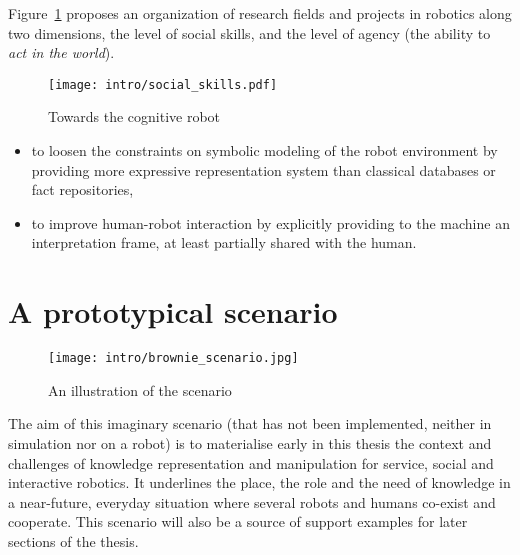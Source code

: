 Figure~\ref{fig|cognitive-robots} proposes an organization of research fields
and projects in robotics along two dimensions, the level of social skills, and
the level of agency (the ability to \emph{act in the world}).

\begin{figure}
    \centering
    \texttt{[image: intro/social\_skills.pdf]}
    \caption{Towards the cognitive robot}
    \label{fig|cognitive-robots}
\end{figure}



\begin{itemize}
    \item to loosen the constraints on symbolic modeling of the robot
    environment by providing more expressive representation system than
    classical databases or fact repositories,

    \item to improve human-robot interaction by explicitly providing to the
    machine an interpretation frame, at least partially shared with the human.

\end{itemize}



\section{A prototypical scenario}
\label{sect|scenario}

\begin{figure*}
	\centering
	\texttt{[image: intro/brownie\_scenario.jpg]}
	\caption{An illustration of the scenario}
	\label{fig|scenario}
\end{figure*}

The aim of this imaginary scenario (that has not been implemented, neither in
simulation nor on a robot) is to materialise early in this thesis the context
and challenges of knowledge representation and manipulation for service, social
and interactive robotics. It underlines the place, the role and the need of
knowledge in a near-future, everyday situation where several robots and humans
co-exist and cooperate. This scenario will also be a source of support examples
for later sections of the thesis.

